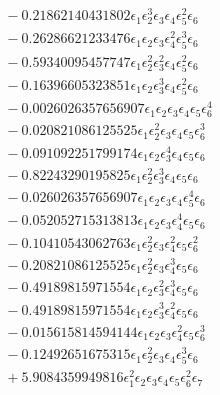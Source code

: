 \documentclass[10pt]{article}
\begin{document}
\begin{align*}
&{}  - 0.21862140431802 \epsilon_{1} \epsilon_{2}^{3} \epsilon_{3} \epsilon_{4} \epsilon_{5}^{2} \epsilon_{6} \\
&{}  - 0.26286621233476 \epsilon_{1} \epsilon_{2} \epsilon_{3} \epsilon_{4}^{2} \epsilon_{5}^{3} \epsilon_{6} \\
&{}  - 0.59340095457747 \epsilon_{1} \epsilon_{2}^{2} \epsilon_{3}^{2} \epsilon_{4} \epsilon_{5}^{2} \epsilon_{6} \\
&{}  - 0.16396605323851 \epsilon_{1} \epsilon_{2} \epsilon_{3}^{3} \epsilon_{4} \epsilon_{5}^{2} \epsilon_{6} \\
&{}  - 0.0026026357656907 \epsilon_{1} \epsilon_{2} \epsilon_{3} \epsilon_{4} \epsilon_{5} \epsilon_{6}^{4} \\
&{}  - 0.020821086125525 \epsilon_{1} \epsilon_{2}^{2} \epsilon_{3} \epsilon_{4} \epsilon_{5} \epsilon_{6}^{3} \\
&{}  - 0.091092251799174 \epsilon_{1} \epsilon_{2} \epsilon_{3}^{4} \epsilon_{4} \epsilon_{5} \epsilon_{6} \\
&{}  - 0.82243290195825 \epsilon_{1} \epsilon_{2}^{2} \epsilon_{3}^{3} \epsilon_{4} \epsilon_{5} \epsilon_{6} \\
&{}  - 0.026026357656907 \epsilon_{1} \epsilon_{2} \epsilon_{3} \epsilon_{4} \epsilon_{5}^{4} \epsilon_{6} \\
&{}  - 0.052052715313813 \epsilon_{1} \epsilon_{2} \epsilon_{3} \epsilon_{4}^{4} \epsilon_{5} \epsilon_{6} \\
&{}  - 0.10410543062763 \epsilon_{1} \epsilon_{2}^{2} \epsilon_{3} \epsilon_{4}^{2} \epsilon_{5} \epsilon_{6}^{2} \\
&{}  - 0.20821086125525 \epsilon_{1} \epsilon_{2}^{2} \epsilon_{3} \epsilon_{4}^{3} \epsilon_{5} \epsilon_{6} \\
&{}  - 0.49189815971554 \epsilon_{1} \epsilon_{2} \epsilon_{3}^{2} \epsilon_{4}^{3} \epsilon_{5} \epsilon_{6} \\
&{}  - 0.49189815971554 \epsilon_{1} \epsilon_{2} \epsilon_{3}^{3} \epsilon_{4}^{2} \epsilon_{5} \epsilon_{6} \\
&{}  - 0.015615814594144 \epsilon_{1} \epsilon_{2} \epsilon_{3} \epsilon_{4}^{2} \epsilon_{5} \epsilon_{6}^{3} \\
&{}  - 0.12492651675315 \epsilon_{1} \epsilon_{2}^{2} \epsilon_{3} \epsilon_{4} \epsilon_{5}^{3} \epsilon_{6} \\
&{}  + 5.9084359949816 \epsilon_{1}^{2} \epsilon_{2} \epsilon_{3} \epsilon_{4} \epsilon_{5} \epsilon_{6}^{2} \epsilon_{7} \\

\end{align*}
\end{document}
